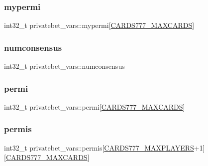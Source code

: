 \subsubsection{\texorpdfstring{mypermi}{mypermi}}
{\footnotesize\ttfamily int32\+\_\+t privatebet\+\_\+vars\+::mypermi\mbox{[}\hyperlink{common_8h_a90f0ea2d767ac1915e44acb24a1fe1bd}{C\+A\+R\+D\+S777\+\_\+\+M\+A\+X\+C\+A\+R\+DS}\mbox{]}}

\mbox{\label{structprivatebet__vars_ae78c3f094c017e1eceb76b38a9191f12}} 
\subsubsection{\texorpdfstring{numconsensus}{numconsensus}}
{\footnotesize\ttfamily int32\+\_\+t privatebet\+\_\+vars\+::numconsensus}

\mbox{\label{structprivatebet__vars_ab84d5fd502ed68296043e4b42a19398f}} 
\subsubsection{\texorpdfstring{permi}{permi}}
{\footnotesize\ttfamily int32\+\_\+t privatebet\+\_\+vars\+::permi\mbox{[}\hyperlink{common_8h_a90f0ea2d767ac1915e44acb24a1fe1bd}{C\+A\+R\+D\+S777\+\_\+\+M\+A\+X\+C\+A\+R\+DS}\mbox{]}}

\mbox{\label{structprivatebet__vars_af2d141af405be918e44dd233bb2c28ce}} 
\subsubsection{\texorpdfstring{permis}{permis}}
{\footnotesize\ttfamily int32\+\_\+t privatebet\+\_\+vars\+::permis\mbox{[}\hyperlink{common_8h_a97d6188fd175f4ea7268e9445107a7c0}{C\+A\+R\+D\+S777\+\_\+\+M\+A\+X\+P\+L\+A\+Y\+E\+RS}+1\mbox{]}\mbox{[}\hyperlink{common_8h_a90f0ea2d767ac1915e44acb24a1fe1bd}{C\+A\+R\+D\+S777\+\_\+\+M\+A\+X\+C\+A\+R\+DS}\mbox{]}}


